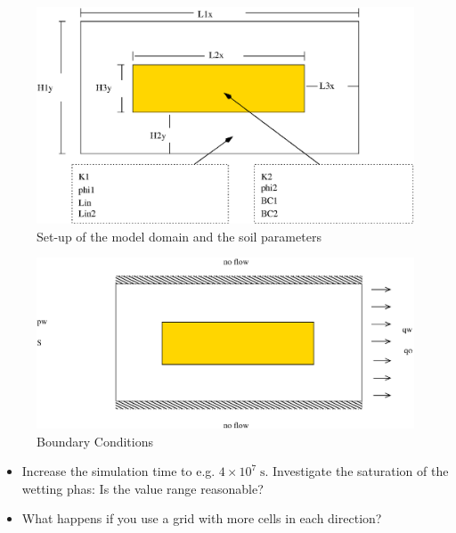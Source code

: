 \begin{figure}[ht]
\centering
\includegraphics[width=0.8\linewidth,keepaspectratio]{EPS/Ex2_Domain.eps}
\caption{Set-up of the model domain and the soil parameters}\label{tutorial-coupled:ex2_Domain}
\end{figure}

\begin{figure}[ht]
\centering
\includegraphics[width=0.8\linewidth,keepaspectratio]{EPS/Ex2_Boundary.eps}
\caption{Boundary Conditions}\label{tutorial-coupled:ex2_BC}
\end{figure}

\begin{itemize}
\item Increase the simulation time to e.g. $4\times 10^7
  \;\text{s}$. Investigate the saturation of the wetting phas: Is the
  value range reasonable?
\item What happens if you use a grid with more cells in each direction?
\end{itemize}

